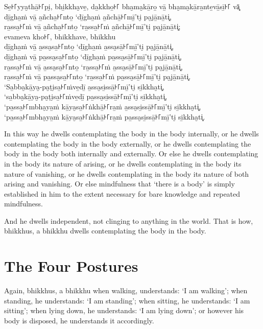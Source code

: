 Se̱꜔꜒yya̮thā̱꜔꜒pi̮, bhi̱kkha̮ve̱, da̱kkho̱꜔꜒ bha̮ma̮kā̱ro̱ vā̱ bha̮ma̮kā̱ra̱nte̱vā̱sī̱꜔꜒ vā͓\\
dī̱gha̱ṁ vā̱ a̱ñcha̱꜔꜒nto̱ ‘dī̱gha̱ṁ a̱ñchā̱꜔꜒mī̱’ti̮ pa̮jā̱nā̱ti͓,\\
ra̱ssa̱꜔꜒ṁ vā̱ a̱ñcha̱꜔꜒nto̱ ‘ra̱ssa̱꜔꜒ṁ a̱ñchā̱꜔꜒mī̱’ti̮ pa̮jā̱nā̱ti͓;\\
evameva kho꜔꜒, bhikkhave, bhikkhu\\
dī̱gha̱ṁ vā̱ a̱ssa̮sa̱꜔꜒nto̱ ‘dī̱gha̱ṁ a̱ssa̮sā̱꜔꜒mī̱’ti̮ pa̮jā̱nā̱ti͓,\\
dī̱gha̱ṁ vā̱ pa̱ssa̮sa̱꜔꜒nto̱ ‘dī̱gha̱ṁ pa̱ssa̮sā̱꜔꜒mī̱’ti̮ pa̮jā̱nā̱ti͓,\\
ra̱ssa̱꜔꜒ṁ vā̱ a̱ssa̮sa̱꜔꜒nto̱ ‘ra̱ssa̱꜔꜒ṁ a̱ssa̮sā̱꜔꜒mī̱’ti̮ pa̮jā̱nā̱ti͓,\\
ra̱ssa̱꜔꜒ṁ vā̱ pa̱ssa̮sa̱꜔꜒nto̱ ‘ra̱ssa̱꜔꜒ṁ pa̱ssa̮sā̱꜔꜒mī̱’ti̮ pa̮jā̱nā̱ti͓.\\
‘Sa̱bba̮kā̱ya̮-pa̮ṭi̮sa̱꜔꜒ṁve̱dī̱ a̱ssa̮si̱ssā̱꜔꜒mī̱’ti̮ si̱kkha̮ti͓,\\
‘sa̱bba̮kā̱ya̮-pa̮ṭi̮sa̱꜔꜒ṁve̱dī̱ pa̱ssa̮si̱ssā̱꜔꜒mī̱’ti̮ si̱kkha̮ti͓,\\
‘pa̱ssa̱꜔꜒mbha̮ya̱ṁ kā̱ya̮sa̱꜔꜒ṅkhā̱꜔꜒ra̱ṁ a̱ssa̮si̱ssā̱꜔꜒mī̱’ti̮ si̱kkha̮ti͓,\\
‘pa̱ssa̱꜔꜒mbha̮ya̱ṁ kā̱ya̮sa̱꜔꜒ṅkhā̱꜔꜒ra̱ṁ pa̱ssa̮si̱ssā̱꜔꜒mī̱’ti̮ si̱kkha̮ti͓.

\englishPage

In this way he dwells contemplating the body in the body internally, or he
dwells contemplating the body in the body externally, or he dwells contemplating
the body in the body both internally and externally. Or else he dwells
contemplating in the body its nature of arising, or he dwells contemplating in
the body its nature of vanishing, or he dwells contemplating in the body its
nature of both arising and vanishing. Or else mindfulness that ‘there is a body’
is simply established in him to the extent necessary for bare knowledge and
repeated mindfulness.

And he dwells independent, not clinging to anything in the world. That is how,
bhikkhus, a bhikkhu dwells contemplating the body in the body.


\section{The Four Postures}

Again, bhikkhus, a bhikkhu when walking, understands: ‘I am walking’; when
standing, he understands: ‘I am standing’; when sitting, he understands: ‘I am
sitting’; when lying down, he understands: ‘I am lying down’; or however his
body is disposed, he understands it accordingly.

